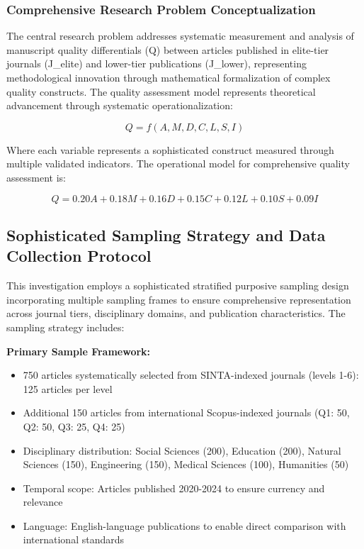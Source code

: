 \documentclass[journal,article,submit,pdftex,moreauthors]{Definitions/mdpi}
\begin{document}
\subsubsection{Comprehensive Research Problem Conceptualization}

The central research problem addresses systematic measurement and analysis of manuscript quality differentials (Q) between articles published in elite-tier journals (J\_elite) and lower-tier publications (J\_lower), representing methodological innovation through mathematical formalization of complex quality constructs. The quality assessment model represents theoretical advancement through systematic operationalization:

\begin{linenomath}
\begin{equation}
Q = f(A, M, D, C, L, S, I)
\end{equation}
\end{linenomath}

Where each variable represents a sophisticated construct measured through multiple validated indicators. The operational model for comprehensive quality assessment is:

\begin{linenomath}
\begin{equation}
Q = 0.20A + 0.18M + 0.16D + 0.15C + 0.12L + 0.10S + 0.09I
\end{equation}
\end{linenomath}

\subsection{Sophisticated Sampling Strategy and Data Collection Protocol}

This investigation employs a sophisticated stratified purposive sampling design incorporating multiple sampling frames to ensure comprehensive representation across journal tiers, disciplinary domains, and publication characteristics. The sampling strategy includes:

\textbf{Primary Sample Framework:}
\begin{itemize}
\item 750 articles systematically selected from SINTA-indexed journals (levels 1-6): 125 articles per level
\item Additional 150 articles from international Scopus-indexed journals (Q1: 50, Q2: 50, Q3: 25, Q4: 25)
\item Disciplinary distribution: Social Sciences (200), Education (200), Natural Sciences (150), Engineering (150), Medical Sciences (100), Humanities (50)
\item Temporal scope: Articles published 2020-2024 to ensure currency and relevance
\item Language: English-language publications to enable direct comparison with international standards
\end{itemize}
\end{document}
